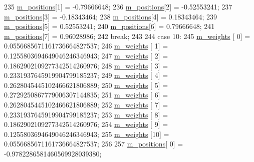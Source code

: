 \begin{DoxyCode}
235       \hyperlink{class_q_u_e_s_o_1_1_base1_d_quadrature_aeda387c028c3ba89ea0f9637a2234212}{m\_positions}[1] = -0.79666648;
236       \hyperlink{class_q_u_e_s_o_1_1_base1_d_quadrature_aeda387c028c3ba89ea0f9637a2234212}{m\_positions}[2] = -0.52553241;
237       \hyperlink{class_q_u_e_s_o_1_1_base1_d_quadrature_aeda387c028c3ba89ea0f9637a2234212}{m\_positions}[3] = -0.18343464;
238       \hyperlink{class_q_u_e_s_o_1_1_base1_d_quadrature_aeda387c028c3ba89ea0f9637a2234212}{m\_positions}[4] =  0.18343464;
239       \hyperlink{class_q_u_e_s_o_1_1_base1_d_quadrature_aeda387c028c3ba89ea0f9637a2234212}{m\_positions}[5] =  0.52553241;
240       \hyperlink{class_q_u_e_s_o_1_1_base1_d_quadrature_aeda387c028c3ba89ea0f9637a2234212}{m\_positions}[6] =  0.79666648;
241       \hyperlink{class_q_u_e_s_o_1_1_base1_d_quadrature_aeda387c028c3ba89ea0f9637a2234212}{m\_positions}[7] =  0.96028986;
242     \textcolor{keywordflow}{break};
243 
244     \textcolor{keywordflow}{case} 10:
245       \hyperlink{class_q_u_e_s_o_1_1_base1_d_quadrature_a7117fec020a8098d1c22b604268bad93}{m\_weights}  [ 0] =  0.0556685671161736664827537;
246       \hyperlink{class_q_u_e_s_o_1_1_base1_d_quadrature_a7117fec020a8098d1c22b604268bad93}{m\_weights}  [ 1] =  0.1255803694649046246346943;
247       \hyperlink{class_q_u_e_s_o_1_1_base1_d_quadrature_a7117fec020a8098d1c22b604268bad93}{m\_weights}  [ 2] =  0.1862902109277342514260976;
248       \hyperlink{class_q_u_e_s_o_1_1_base1_d_quadrature_a7117fec020a8098d1c22b604268bad93}{m\_weights}  [ 3] =  0.2331937645919904799185237;
249       \hyperlink{class_q_u_e_s_o_1_1_base1_d_quadrature_a7117fec020a8098d1c22b604268bad93}{m\_weights}  [ 4] =  0.2628045445102466621806889;
250       \hyperlink{class_q_u_e_s_o_1_1_base1_d_quadrature_a7117fec020a8098d1c22b604268bad93}{m\_weights}  [ 5] =  0.2729250867779006307144835;
251       \hyperlink{class_q_u_e_s_o_1_1_base1_d_quadrature_a7117fec020a8098d1c22b604268bad93}{m\_weights}  [ 6] =  0.2628045445102466621806889;
252       \hyperlink{class_q_u_e_s_o_1_1_base1_d_quadrature_a7117fec020a8098d1c22b604268bad93}{m\_weights}  [ 7] =  0.2331937645919904799185237;
253       \hyperlink{class_q_u_e_s_o_1_1_base1_d_quadrature_a7117fec020a8098d1c22b604268bad93}{m\_weights}  [ 8] =  0.1862902109277342514260976;
254       \hyperlink{class_q_u_e_s_o_1_1_base1_d_quadrature_a7117fec020a8098d1c22b604268bad93}{m\_weights}  [ 9] =  0.1255803694649046246346943;
255       \hyperlink{class_q_u_e_s_o_1_1_base1_d_quadrature_a7117fec020a8098d1c22b604268bad93}{m\_weights}  [10] =  0.0556685671161736664827537;
256 
257       \hyperlink{class_q_u_e_s_o_1_1_base1_d_quadrature_aeda387c028c3ba89ea0f9637a2234212}{m\_positions}[ 0] = -0.9782286581460569928039380;

\end{DoxyCode}
